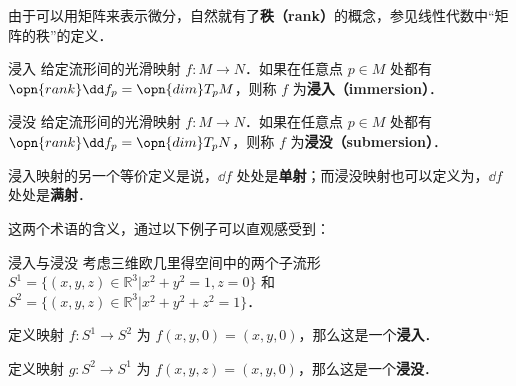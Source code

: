 由于可以用矩阵来表示微分，自然就有了\textbf{秩（rank）}的概念，参见线性代数中“矩阵的秩”的定义．

\begin{definition}{浸入}
给定流形间的光滑映射 $f:M\to N$．如果在任意点 $p\in M$ 处都有 $\opn{rank}\dd f_p=\opn{dim}T_pM$，则称 $f$ 为\textbf{浸入（immersion）}．
\end{definition}

\begin{definition}{浸没}
给定流形间的光滑映射 $f:M\to N$．如果在任意点 $p\in M$ 处都有 $\opn{rank}\dd f_p=\opn{dim}T_pN$，则称 $f$ 为\textbf{浸没（submersion）}．
\end{definition}

浸入映射的另一个等价定义是说，$\dd f$ 处处是\textbf{单射}；而浸没映射也可以定义为，$\dd f$ 处处是\textbf{满射}．

这两个术语的含义，通过以下例子可以直观感受到：

\begin{example}{浸入与浸没}
考虑三维欧几里得空间中的两个子流形 $S^1=\{(x, y, z)\in\mathbb{R}^3|x^2+y^2=1, z=0\}$ 和 $S^2=\{(x, y, z)\in\mathbb{R}^3|x^2+y^2+z^2=1\}$．

定义映射 $f:S^1\to S^2$ 为 $f(x, y, 0)=(x, y, 0)$，那么这是一个\textbf{浸入}．

定义映射 $g:S^2\to S^1$ 为 $f(x, y, z)=(x, y, 0)$，那么这是一个\textbf{浸没}．
\end{example}

















